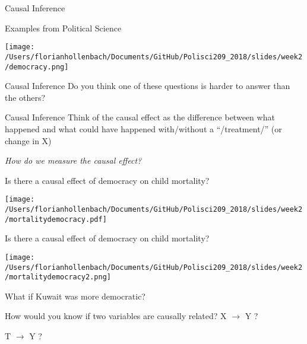 \documentclass[presentation]{beamer}
\begin{document}
\begin{frame}[label={sec:org9eae61a}]{Causal Inference}
\begin{block}{Examples from Political Science}
\begin{center}
\texttt{[image: /Users/florianhollenbach/Documents/GitHub/Polisci209\_2018/slides/week2/democracy.png]}
\end{center}
\end{block}
\end{frame}

\begin{frame}[label={sec:org2ff6dff}]{Causal Inference}
Do you think one of these questions is harder to answer than the others?
\end{frame}

\begin{frame}[label={sec:org6633a1a}]{Causal Inference}
Think of the causal effect as the difference between what happened and what could have happened with/without a “/treatment/” (or change in X)

\emph{How do we measure the causal effect?}
\end{frame}

\begin{frame}[label={sec:orgc9c3fab}]{Is there a causal effect of democracy on child mortality?}
\begin{center}
\texttt{[image: /Users/florianhollenbach/Documents/GitHub/Polisci209\_2018/slides/week2/mortalitydemocracy.pdf]}
\end{center}
\end{frame}

\begin{frame}[label={sec:org6a6848a}]{Is there a causal effect of democracy on child mortality?}
\begin{center}
\texttt{[image: /Users/florianhollenbach/Documents/GitHub/Polisci209\_2018/slides/week2/mortalitydemocracy2.png]}
\end{center}
\begin{block}{What if Kuwait was more democratic?}
\end{block}
\end{frame}

\begin{frame}[label={sec:org469c4bb}]{How would you know if two variables are causally related?}
\LARGE{X $\rightarrow$ Y ?}

\pause
\LARGE{T $\rightarrow$ Y ?}
\end{frame}
\end{document}
